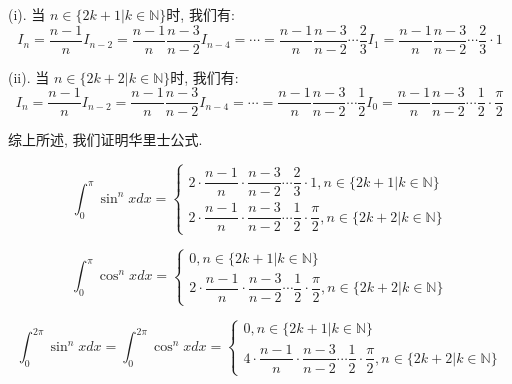 \begin{theorem}[华里士公式]
	(i). 当 $n \in\{2k+1|k\in \mathbb{N}\}$时, 我们有:
	$$I_{n} = \dfrac{n-1}{n}I_{n-2} =  \dfrac{n-1}{n}\dfrac{n-3}{n-2}I_{n-4} =\cdots =  \dfrac{n-1}{n}\dfrac{n-3}{n-2}\cdots \dfrac{2}{3}I_{1} = \dfrac{n-1}{n}\dfrac{n-3}{n-2}\cdots \dfrac{2}{3}\cdot 1$$

	(ii). 当 $n \in\{2k+2|k\in \mathbb{N}\}$时, 我们有:
	$$I_{n} = \dfrac{n-1}{n}I_{n-2} =  \dfrac{n-1}{n}\dfrac{n-3}{n-2}I_{n-4} =\cdots =  \dfrac{n-1}{n}\dfrac{n-3}{n-2}\cdots \dfrac{1}{2}I_{0} = \dfrac{n-1}{n}\dfrac{n-3}{n-2}\cdots \dfrac{1}{2}\cdot \dfrac{\pi}{2}$$

	综上所述, 我们证明华里士公式.

	\begin{corollary}[华里士公式推论]
		$$\int_{0}^{\pi}\sin^{n}x dx =
	\begin{cases} 
	2\cdot\dfrac{n-1}{n}\cdot \dfrac{n-3}{n-2}\cdots \dfrac{2}{3}\cdot 1, n\in \{2k+1|k\in \mathbb{N}\} \\
	2\cdot\dfrac{n-1}{n}\cdot \dfrac{n-3}{n-2}\cdots \dfrac{1}{2}\cdot \dfrac{\pi}{2}, n\in \{2k+2|k\in \mathbb{N}\}  
	\end{cases}$$

	$$\int_{0}^{\pi}\cos^{n}x dx =
	\begin{cases} 
	0, n\in \{2k+1|k\in \mathbb{N}\} \\
	2\cdot\dfrac{n-1}{n}\cdot \dfrac{n-3}{n-2}\cdots \dfrac{1}{2}\cdot \dfrac{\pi}{2}, n\in \{2k+2|k\in \mathbb{N}\}  
	\end{cases}$$

	$$\int_{0}^{2\pi}\sin^{n}x dx = \int_{0}^{2\pi}\cos^{n} xdx =
	\begin{cases} 
	0, n\in \{2k+1|k\in \mathbb{N}\} \\
	4\cdot\dfrac{n-1}{n}\cdot \dfrac{n-3}{n-2}\cdots \dfrac{1}{2}\cdot \dfrac{\pi}{2}, n\in \{2k+2|k\in \mathbb{N}\}  
	\end{cases}$$
	\end{corollary}
\end{theorem}
